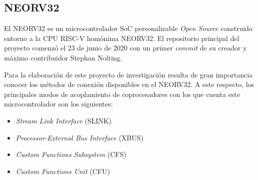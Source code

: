 
\subsection{NEORV32}

\label{neorv32}

    
El NEORV32 es un microcontrolador SoC personalizable \textit{Open Source} construido entorno a la CPU RISC-V homónima NEORV32.
El repositorio principal del proyecto comenzó el 23 de junio de 2020 con un primer \textit{commit} de su creador y máximo contribuidor Stephan Nolting.

Para la elaboración de este proyecto de investigación resulta de gran importancia conocer los métodos de conexión disponibles en el NEORV32.
A este respecto, los principales modos de acoplamiento de coprocesadores con los que cuenta este microcontrolador son los siguientes:

\begin{itemize}
    \item \textit{Stream Link Interface} (SLINK)
    \item \textit{Processor-External Bus Interface} (XBUS)
    \item \textit{Custom Functions Subsystem} (CFS)
    \item \textit{Custom Functions Unit} (CFU)
\end{itemize} 

